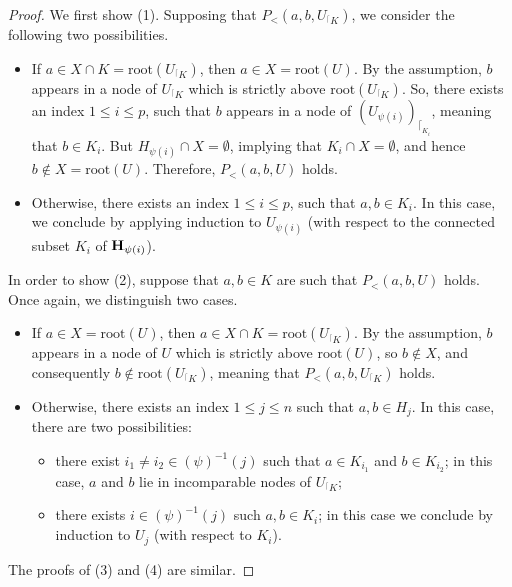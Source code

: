 \documentclass{article}
\theoremstyle{plain}
\theoremstyle{definition}
\newcommand{\restrconstr}[2]{{#1}_{{}^\lceil {#2}}}
\begin{document}
\begin{proof}
We first show (1). Supposing that $P_<(a,b,\restrconstr{U}{K})$, we consider the following two possibilities. 
\begin{itemize}
\item If $a\in X\cap K=\text{root}(\restrconstr{U}{K})$, then $a\in X=\text{root}(U)$. By the assumption, $b$ appears in a node of $\restrconstr{U}{K}$ which is strictly above $\text{root}(\restrconstr{U}{K})$. So, there exists an index $1\leq i\leq p$, such that $b$ appears in a node of $(U_{\psi(i)})_{\lceil_{K_i}}$, meaning that $b\in K_i$. But ${H}_{\psi(i)}\cap X=\emptyset$, implying that ${K}_{i}\cap X=\emptyset$, and hence   $b\not\in X=\text{root}(U)$. Therefore,  $P_<(a,b,U)$ holds.
\item Otherwise, there exists an index $1\leq i\leq p$, such that $a,b\in K_i$. In this case, we conclude by applying induction to 
$U_{\psi(i)}$ (with respect to the connected subset $K_i$ of ${\bf H}_{\psi(i)}$).
\end{itemize}
In order to show (2), suppose that $a,b\in K$ are such that $P_<(a,b,U)$ holds. Once again, we distinguish  two  cases. 
\begin{itemize}
\item If $a\in X=\text{root}(U)$, then $a\in X\cap K=\text{root}(\restrconstr{U}{K})$. By the assumption, $b$ appears in a node of $U$ which is strictly above $\text{root}(U)$, so $b\not\in X$, and consequently $b\notin \text{root}(\restrconstr{U}{K})$, meaning that  $P_<(a,b,\restrconstr{U}{K})$ holds.
\item Otherwise, there exists an index $1\leq j\leq n$ such that $a,b\in H_j$. In this case, there are two possibilities:
\begin{itemize}
\item there exist $i_1\neq i_2\in (\psi)^{-1}(j)$ such that $a\in K_{i_1}$ and $b\in K_{i_2}$; in this case, $a$ and $b$ lie in incomparable nodes of 
$\restrconstr{U}{K}$;
\item there exists $i\in (\psi)^{-1}(j)$ such $a,b\in K_i$; in this case we conclude by induction to $U_j$ (with respect to $K_i$).
\end{itemize}

 
 
\end{itemize}
The proofs of (3) and (4) are similar.


\end{proof}
\end{document}
